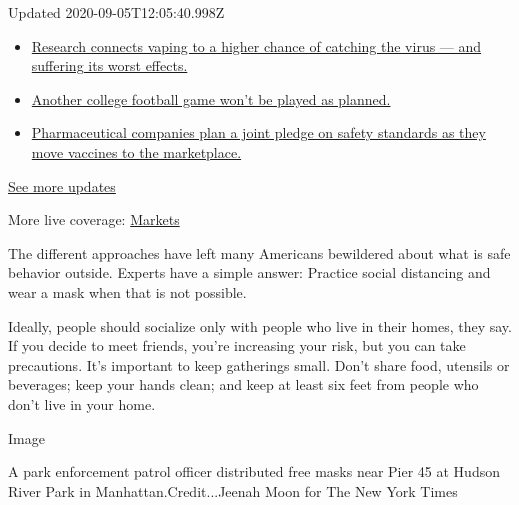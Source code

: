 Updated 2020-09-05T12:05:40.998Z

\begin{itemize}
\tightlist
\item
  \href{https://www.nytimes3xbfgragh.onion/2020/09/04/world/covid-19-coronavirus.html?action=click\&pgtype=Article\&state=default\&region=MAIN_CONTENT_1\&context=storylines_live_updates\#link-1654f6ad}{Research
  connects vaping to a higher chance of catching the virus --- and
  suffering its worst effects.}
\item
  \href{https://www.nytimes3xbfgragh.onion/2020/09/04/world/covid-19-coronavirus.html?action=click\&pgtype=Article\&state=default\&region=MAIN_CONTENT_1\&context=storylines_live_updates\#link-52e4198a}{Another
  college football game won't be played as planned.}
\item
  \href{https://www.nytimes3xbfgragh.onion/2020/09/04/world/covid-19-coronavirus.html?action=click\&pgtype=Article\&state=default\&region=MAIN_CONTENT_1\&context=storylines_live_updates\#link-181cef0}{Pharmaceutical
  companies plan a joint pledge on safety standards as they move
  vaccines to the marketplace.}
\end{itemize}

\href{https://www.nytimes3xbfgragh.onion/2020/09/04/world/covid-19-coronavirus.html?action=click\&pgtype=Article\&state=default\&region=MAIN_CONTENT_1\&context=storylines_live_updates}{See
more updates}

More live coverage:
\href{https://www.nytimes3xbfgragh.onion/live/2020/09/04/business/stock-market-today-coronavirus?action=click\&pgtype=Article\&state=default\&region=MAIN_CONTENT_1\&context=storylines_live_updates}{Markets}

The different approaches have left many Americans bewildered about what
is safe behavior outside. Experts have a simple answer: Practice social
distancing and wear a mask when that is not possible.

Ideally, people should socialize only with people who live in their
homes, they say. If you decide to meet friends, you're increasing your
risk, but you can take precautions. It's important to keep gatherings
small. Don't share food, utensils or beverages; keep your hands clean;
and keep at least six feet from people who don't live in your home.

Image

A park enforcement patrol officer distributed free masks near Pier 45 at
Hudson River Park in Manhattan.Credit...Jeenah Moon for The New York
Times

